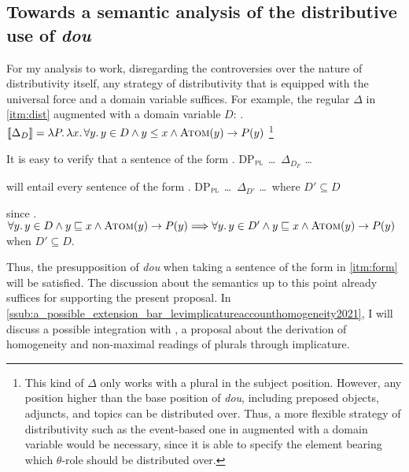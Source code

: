 \documentclass[12pt]{article}
\DeclareMathOperator{\atom}{\textsc{Atom}}
\begin{document}
\subsection{Towards a semantic analysis of the distributive use of \emph{dou}}
\label{sub:towards_a_semantic_analysis_of_the_distributive_use_of_dou}
For my analysis to work, disregarding the controversies over the nature of distributivity itself, any strategy of distributivity that is equipped with the universal force and a domain variable suffices.
For example, the regular \(\Delta\) in \cref{itm:dist} augmented with a domain variable \(D\):
\ex. \(\llbracket \Delta_D \rrbracket = \lambda P.\, \lambda x.\, \forall y.\, y \in D \land y \leq x \land \atom(y) \to P(y)\)
\footnote{This kind of \(\Delta\) only works with a plural in the subject position.
  However, any position higher than the base position of \emph{dou}, including preposed objects, adjuncts, and topics can be distributed over.
  Thus, a more flexible strategy of distributivity such as the event-based one in \citet{champollionCovertDistributivityAlgebraic2016} augmented with a domain variable would be necessary, since it is able to specify the element bearing which \(\theta\)-role should be distributed over.
}

It is easy to verify that a sentence of the form
\ex. DP\(_{\textsc{pl}}\) \ldots\ \(\Delta_{D_F}\) \ldots\ \label{itm:form}

will entail every sentence of the form
\ex. DP\(_{\textsc{pl}}\) \ldots\ \(\Delta_{D'}\) \ldots\ where \(D' \subseteq D\)

since
\ex. \(\forall y.\, y \in D \land y \sqsubseteq x \land \atom(y) \to P(y) \Longrightarrow  \forall y.\, y \in D' \land y \sqsubseteq x \land \atom(y) \to P(y) \) when \(D' \subseteq D\).

Thus, the presupposition of \emph{dou} when taking a sentence of the form in \cref{itm:form} will be satisfied.
The discussion about the semantics up to this point already suffices for supporting the present proposal.
In \cref{ssub:a_possible_extension_bar_levimplicatureaccounthomogeneity2021}, I will discuss a possible integration with \citet{bar-levImplicatureAccountHomogeneity2021}, a proposal about the derivation of homogeneity and non-maximal readings of plurals through implicature.
\end{document}

